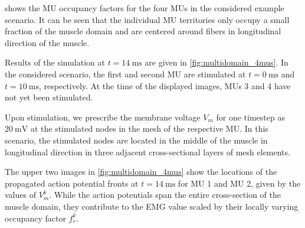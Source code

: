  shows the MU occupancy factors for the four MUs in the considered example scenario. It can be seen that the individual MU territories only occupy a small fraction of the muscle domain and are centered around fibers in longitudinal direction of the muscle.

Results of the simulation at $t=\SI{14}{\ms}$ are given in \cref{fig:multidomain_4mus}. In the considered scenario, the first and second MU are stimulated at $t=\SI{0}{\ms}$ and $t=\SI{10}{\ms}$, respectively. At the time of the displayed images, MUs 3 and 4 have not yet been stimulated. 

Upon stimulation, we prescribe the membrane voltage $V_m$ for one timestep as $\SI{20}{\milli\volt}$ at the stimulated nodes in the mesh of the respective MU. In this scenario, the stimulated nodes are located in the middle of the muscle in longitudinal direction in three adjacent cross-sectional layers of mesh elements.

The upper two images in \cref{fig:multidomain_4mus} show the locations of the propagated action potential fronts at $t=\SI{14}{\ms}$ for MU 1 and MU 2, given by the values of $V_m^k$. While the action potentials span the entire cross-section of the muscle domain, they contribute to the EMG value scaled by their locally varying occupancy factor $f_r^k$.

